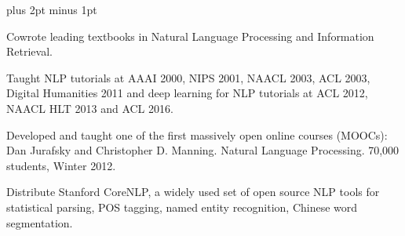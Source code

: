 \documentclass[11pt]{article}
\def\url#1{{\small\sf #1}}
\begin{document}
\begin{vita}
\begin{Products (other significant)}




\end{Products (other significant)}

\begin{Synergistic Activities}
\itemsep=2pt plus 2pt minus 1pt
\item Cowrote leading textbooks in Natural
  Language Processing and Information Retrieval.

\item Taught NLP tutorials at AAAI 2000, NIPS 2001, NAACL 2003,
ACL 2003, Digital Humanities 2011 and deep learning for NLP tutorials at ACL 2012, NAACL
HLT 2013 and ACL 2016.

\item Developed and taught one of the first massively open online
  courses (MOOCs): Dan Jurafsky and Christopher D. Manning. Natural Language Processing. 70,000 students, Winter 2012.

\item Distribute Stanford CoreNLP, a widely used set of open source NLP tools for statistical parsing,
POS tagging, named entity recognition, Chinese word segmentation.


\end{Synergistic Activities}
\end{vita}
\end{document}
